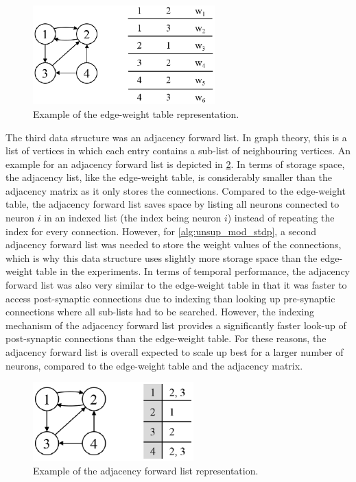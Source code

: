 \begin{figure}
	\centering
	\includegraphics[width=7cm]{fig/largesnn/ijv_table.eps}
	\caption{Example of the edge-weight table representation.}
	\label{fig:ijv_tab}
\end{figure}

The third data structure was an adjacency forward list. In graph theory, this is a list of vertices in which each entry contains a sub-list of neighbouring vertices. An example for an adjacency forward list is depicted in \figurename \ref{fig:adj_list}. In terms of storage space, the adjacency list, like the edge-weight table, is considerably smaller than the adjacency matrix as it only stores the connections. Compared to the edge-weight table, the adjacency forward list saves space by listing all neurons connected to neuron $i$ in an indexed list (the index being neuron $i$) instead of repeating the index for every connection. However, for \algorithmname \ref{alg:unsup_mod_stdp}, a second adjacency forward list was needed to store the weight values of the connections, which is why this data structure uses slightly more storage space than the edge-weight table in the experiments. In terms of temporal performance, the adjacency forward list was also very similar to the edge-weight table in that it was faster to access post-synaptic connections due to indexing than looking up pre-synaptic connections where all sub-lists had to be searched. However, the indexing mechanism of the adjacency forward list provides a significantly faster look-up of post-synaptic connections than the edge-weight table. For these reasons, the adjacency forward list is overall expected to scale up best for a larger number of neurons, compared to the edge-weight table and the adjacency matrix.

\begin{figure}
	\centering
	\includegraphics[width=6.2cm]{fig/largesnn/adj_list.eps}
	\caption{Example of the adjacency forward list representation.}
	\label{fig:adj_list}
\end{figure}

